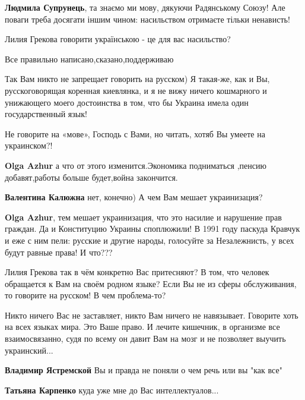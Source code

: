 \begin{itemize}
\begin{itemize}
\textbf{Людмила Супрунець}, та знаємо ми мову, дякуючи Радянському Союзу! Але поваги треба досягати іншим чином: насильством отримаєте тільки ненависть!

Лилия Грекова говорити українською - це для вас насильство?
\end{itemize}

Все правильно написано,сказано,поддерживаю


Так Вам никто не запрещает говорить на русском) Я такая-же, как и Вы,
русскоговорящая коренная киевлянка, и я не вижу ничего кошмарного и унижающего
моего достоинства в том, что бы Украина имела один государственный язык!

Не говорите на «мове», Господь с Вами, но читать, хотяб Вы умеете на украинском?!

\textbf{Olga Azhur} а что от этого изменится.Экономика подниматься ,пенсию добавят,работы больше будет,война закончится.

\textbf{Валентина Калюжна} нет, конечно) А чем Вам мешает украинизация?

\textbf{Olga Azhur}, тем мешает украинизация, что это насилие и нарушение прав
граждан. Да и Конституцию Украины споплюжили! В 1991 году паскуда Кравчук и еже
с ним пели: русские и другие народы, голосуйте за Незалежнисть, у всех будут
равные права! И что???


Лилия Грекова так в чём конкретно Вас притесняют? В том, что человек обращается
к Вам на своём родном языке? Если Вы не из сферы обслуживания, то говорите на
русском! В чем проблема-то?


Никто ничего Вас не заставляет, никто Вам ничего не навязывает. Говорите хоть
на всех языках мира. Это Ваше право. И лечите кишечник, в организме все
взаимосвязанно, судя по всему он давит Вам на мозг и не позволяет выучить
украинский...

\begin{itemize}
\textbf{Владимир Ястремской} Вы и правда не поняли о чем речь или вы "как все"

\textbf{Татьяна Карпенко} куда уже мне до Вас интеллектуалов...


\end{itemize}
\end{itemize}
